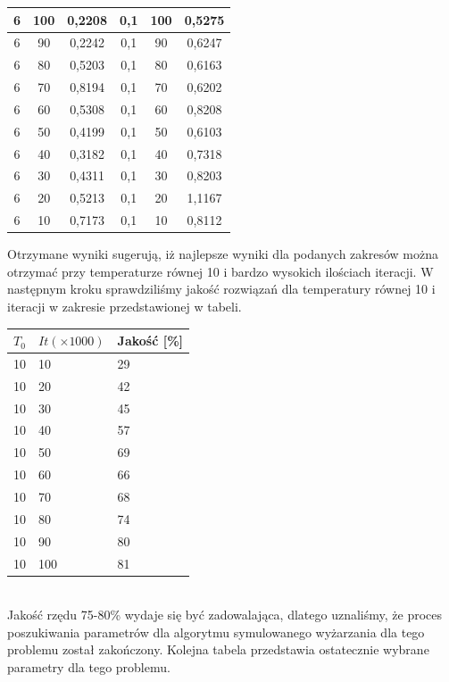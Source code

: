\documentclass[twoside]{projektInzynierskiMS1}
\newcommand{\si}{ś}
\begin{document}
\begin{table}[htbp]
{\begin{tabular}{|c|c|c||c|c|c|}
6 & 100 & 0,2208 & 0,1 & 100 & 0,5275 \\ \hline 
6 & 90 & 0,2242& 0,1 & 90 & 0,6247 \\ \hline 
6 & 80 & 0,5203 & 0,1 & 80 & 0,6163 \\ \hline 
6 & 70 & 0,8194 & 0,1 & 70 & 0,6202 \\ \hline 
6 & 60 & 0,5308 & 0,1 & 60 & 0,8208 \\ \hline
6 & 50 & 0,4199& 0,1 & 50 & 0,6103 \\ \hline 
6 & 40 & 0,3182 & 0,1 & 40 & 0,7318\\ \hline 
6 & 30 & 0,4311 & 0,1 & 30 & 0,8203 \\ \hline 
6 & 20 & 0,5213 & 0,1 & 20 & 1,1167 \\ \hline 
6 & 10 & 0,7173 & 0,1 & 10 & 0,8112 \\ \hline 
\end{tabular} 
}
\end{table}



Otrzymane wyniki sugerują, iż najlepsze wyniki dla podanych zakresów można otrzymać przy temperaturze równej 10 i bardzo wysokich ilo\si ciach iteracji. W następnym kroku sprawdzili\si my jako\si ć rozwiązań dla temperatury równej 10 i iteracji w zakresie przedstawionej w tabeli. \\

\begin{tabularx}{\textwidth}{|X|X|X|} 
                  \hline
 $T_0$ & $It (\times 1000)$& Jako\si ć [\%]\\ \hline
10 & 10 & 29 \\ \hline
10 & 20 & 42 \\ \hline
10 & 30 & 45 \\ \hline 
10 & 40 & 57 \\ \hline 
10 & 50 & 69 \\ \hline 
10 & 60 & 66 \\ \hline
10 & 70 & 68 \\ \hline 
10 & 80 & 74 \\ \hline 
10 & 90 &  80\\ \hline 
10 & 100 & 81 \\ \hline 
\end{tabularx} \\

Jako\si ć rzędu 75-80\% wydaje się być zadowalająca, dlatego uznali\si my, że proces poszukiwania parametrów dla algorytmu symulowanego wyżarzania dla tego problemu został zakończony. Kolejna tabela przedstawia ostatecznie wybrane parametry dla tego problemu. \\
\end{document}
